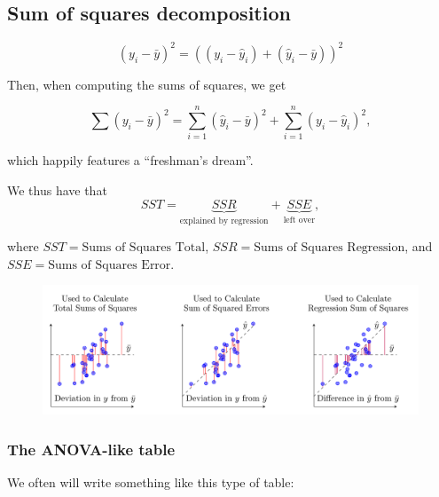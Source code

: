 \documentclass[
  letterpaper,
  DIV=11,
  numbers=noendperiod]{scrreport}
\begin{document}
\hypertarget{sum-of-squares-decomposition}{%
\subsection{Sum of squares
decomposition}\label{sum-of-squares-decomposition}}

\[(y_i - \bar y)^2 = ((y_i - \hat y_i) + (\hat y_i - \bar y))^2\]

Then, when computing the sums of squares, we get

\[\sum(y_i - \bar y)^2 = \sum_{i=1}^n (\hat y_i - \bar y)^2 + \sum_{i=1}^n (y_i - \hat y_i)^2,\]

which happily features a ``freshman's dream''.

We thus have that
\[SST = \underbrace{SSR}_{\text{explained by regression}} + \underbrace{SSE}_{\text{left over}},\]

where \(SST = \text{Sums of Squares Total}\),
\(SSR = \text{Sums of Squares Regression}\), and
\(SSE = \text{Sums of Squares Error}\).

\begin{figure}

{\centering \includegraphics[width=1\textwidth,height=\textheight]{week3/standalone_figures/residual_decompositions/residual_decomposition.svg}

}

\end{figure}

\hypertarget{the-anova-like-table}{%
\subsubsection{The ANOVA-like table}\label{the-anova-like-table}}

We often will write something like this type of table:
\end{document}
